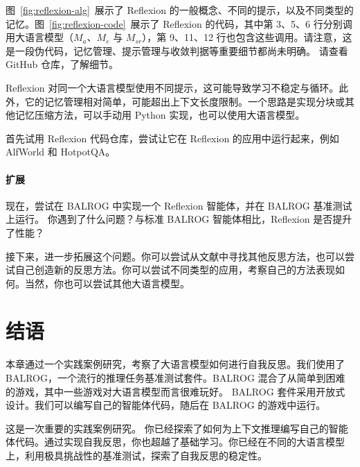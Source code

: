 图~\ref{fig:reflexion-alg}~展示了 Reflexion 的一般概念、不同的提示，以及不同类型的记忆。图~\ref{fig:reflexion-code}~展示了 Reflexion 的代码，其中第 3、5、6 行分别调用大语言模型（$M_a$、$M_e$ 与 $M_{sr}$），第 9、11、12 行也包含这些调用。请注意，这是一段伪代码，记忆管理、提示管理与收敛判据等重要细节都尚未明确。
请查看 GitHub 仓库，了解细节。

Reflexion 对同一个大语言模型使用不同提示，这可能导致学习不稳定与循环。此外，它的记忆管理相对简单，可能超出上下文长度限制。一个思路是实现分块或其他记忆压缩方法，可以手动用 Python 实现，也可以使用大语言模型。

首先试用 Reflexion 代码仓库，尝试让它在 Reflexion 的应用中运行起来，例如 AlfWorld 和 HotpotQA。

\paragraph{扩展}
现在，尝试在 BALROG 中实现一个 Reflexion 智能体，并在 BALROG 基准测试上运行。
你遇到了什么问题？与标准 BALROG 智能体相比，Reflexion 是否提升了性能？

接下来，进一步拓展这个问题。你可以尝试从文献中寻找其他反思方法，也可以尝试自己创造新的反思方法。你可以尝试不同类型的应用，考察自己的方法表现如何。当然，你也可以尝试其他大语言模型。

\section{结语}
本章通过一个实践案例研究，考察了大语言模型如何进行自我反思。我们使用了 BALROG，一个流行的推理任务基准测试套件。BALROG 混合了从简单到困难的游戏，其中一些游戏对大语言模型而言很难玩好。
BALROG 套件采用开放式设计。我们可以编写自己的智能体代码，随后在 BALROG 的游戏中运行。

这是一次重要的实践案例研究。
你已经探索了如何为上下文推理编写自己的智能体代码。通过实现自我反思，你也超越了基础学习。你已经在不同的大语言模型上，利用极具挑战性的基准测试，探索了自我反思的稳定性。




